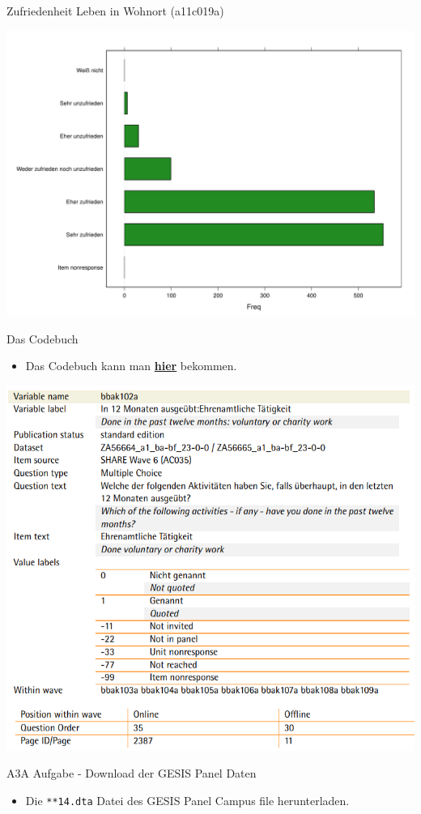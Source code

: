 \documentclass[ignorenonframetext,]{beamer}
\providecommand{\tightlist}{%
  \setlength{\itemsep}{0pt}\setlength{\parskip}{0pt}}
\begin{document}
\begin{frame}{Zufriedenheit Leben in Wohnort (a11c019a)}

\includegraphics{A3_GESISPanel_files/figure-beamer/unnamed-chunk-27-1.pdf}

\end{frame}

\begin{frame}{Das Codebuch}

\begin{itemize}
\tightlist
\item
  Das Codebuch kann man
  \href{https://www.gesis.org/gesis-panel/documentation/}{\textbf{hier}}
  bekommen.
\end{itemize}

\includegraphics{figure/cdb_bbak102a.PNG}

\end{frame}

\begin{frame}[fragile]{A3A Aufgabe - Download der GESIS Panel Daten}

\begin{itemize}
\tightlist
\item
  Die \texttt{**14.dta} Datei des GESIS Panel Campus file herunterladen.
\end{itemize}

\end{frame}
\end{document}

